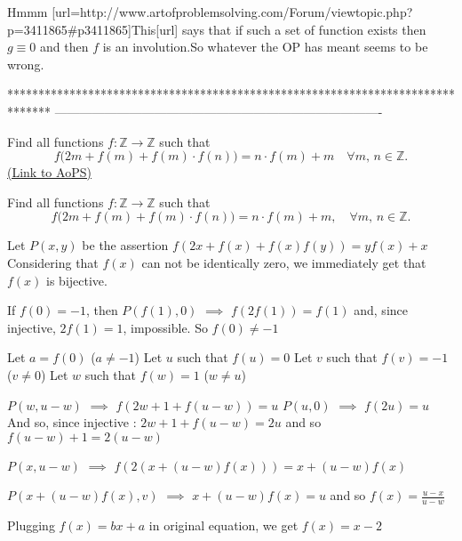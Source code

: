 \begin{solution}
	Hmmm [url=http://www.artofproblemsolving.com/Forum/viewtopic.php?p=3411865#p3411865]This[\/url] says that if such a set of function exists then $g\equiv 0$ and then $f$ is an involution.So whatever the OP has meant seems to be wrong.
\end{solution}
*******************************************************************************
-------------------------------------------------------------------------------

\begin{problem}
	Find all functions $f:\mathbb Z \to \mathbb Z$ such that \[f\big(2m+f(m)+f(m)\cdot f(n)\big)=n\cdot f(m)+m \quad \forall m,\,n \in \mathbb Z.\]
	\flushright \href{https://artofproblemsolving.com/community/c6h582347}{(Link to AoPS)}
\end{problem}



\begin{solution}
	\begin{tcolorbox}Find all functions $f:\mathbb Z \to \mathbb Z$ such that \[f\big(2m+f(m)+f(m)\cdot f(n)\big)=n\cdot f(m)+m,\quad\forall m,\,n \in \mathbb Z.\]\end{tcolorbox}
Let $P(x,y)$ be the assertion $f(2x+f(x)+f(x)f(y))=yf(x)+x$
Considering that $f(x)$ can not be identically zero, we immediately get that $f(x)$ is bijective.

If $f(0)=-1$, then $P(f(1),0)$ $\implies$ $f(2f(1))=f(1)$ and, since injective, $2f(1)=1$, impossible. So $f(0)\ne -1$

Let $a=f(0)$ ($a\ne -1$)
Let $u$ such that $f(u)=0$
Let $v$ such that $f(v)=-1$ ($v\ne 0$)
Let $w$ such that $f(w)=1$ ($w\ne u$)

$P(w,u-w)$ $\implies$ $f(2w+1+f(u-w))=u$
$P(u,0)$ $\implies$ $f(2u)=u$
And so, since injective : $2w+1+f(u-w)=2u$ and so $f(u-w)+1=2(u-w)$

$P(x,u-w)$ $\implies$ $f(2(x+(u-w)f(x)))=x+(u-w)f(x)$

$P(x+(u-w)f(x),v)$ $\implies$ $x+(u-w)f(x)=u$ and so $f(x)=\frac{u-x}{u-w}$

Plugging $f(x)=bx+a$ in original equation, we get $\boxed{f(x)=x-2}$
\end{solution}



